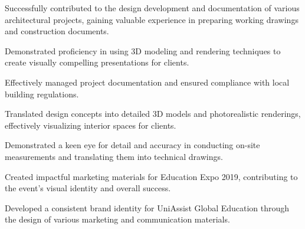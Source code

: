 \begin{minipage}[t]{0.63\textwidth}
    \summaryPoints{}
    \vspace{5pt}
    \begin{tightemize}
      \item Successfully contributed to the design development and documentation of various architectural projects, gaining valuable experience in preparing working drawings and construction documents.
      \item Demonstrated proficiency in using 3D modeling and rendering techniques to create visually compelling presentations for clients.
      \item Effectively managed project documentation and ensured compliance with local building regulations.
    \end{tightemize}
  \sectionsep

    \summaryPoints{}
    \vspace{5pt}
    \begin{tightemize}
      \item Translated design concepts into detailed 3D models and photorealistic renderings, effectively visualizing interior spaces for clients.
      \item Demonstrated a keen eye for detail and accuracy in conducting on-site measurements and translating them into technical drawings.
    \end{tightemize}
  \sectionsep

    \summaryPoints{}
    \vspace{5pt}
    \begin{tightemize}
      \item Created impactful marketing materials for Education Expo 2019, contributing to the event's visual identity and overall success.
      \item Developed a consistent brand identity for UniAssist Global Education through the design of various marketing and communication materials.
    \end{tightemize}
  \sectionsep

  \end{minipage}

